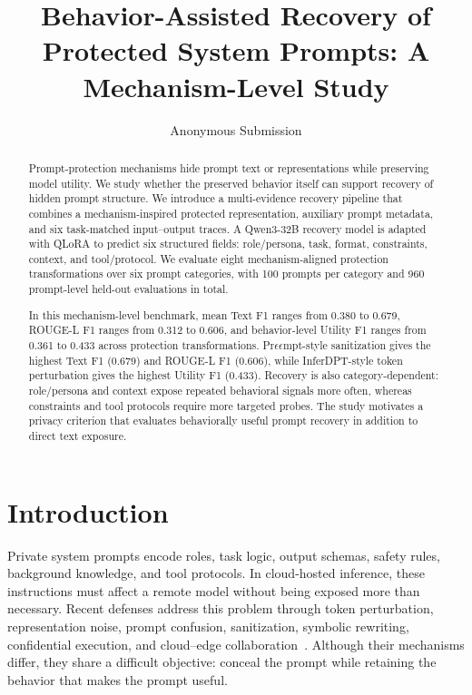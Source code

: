 \documentclass[letterpaper]{article} %
\title{Behavior-Assisted Recovery of Protected System Prompts: A Mechanism-Level Study}
\author{Anonymous Submission}
\begin{document}
\maketitle

\begin{abstract}
Prompt-protection mechanisms hide prompt text or representations while preserving model utility.  We study whether the preserved behavior itself can support recovery of hidden prompt structure.  We introduce a multi-evidence recovery pipeline that combines a mechanism-inspired protected representation, auxiliary prompt metadata, and six task-matched input--output traces.  A Qwen3-32B recovery model is adapted with QLoRA to predict six structured fields: role/persona, task, format, constraints, context, and tool/protocol.  We evaluate eight mechanism-aligned protection transformations over six prompt categories, with 100 prompts per category and 960 prompt-level held-out evaluations in total.

In this mechanism-level benchmark, mean Text F1 ranges from 0.380 to 0.679, ROUGE-L F1 ranges from 0.312 to 0.606, and behavior-level Utility F1 ranges from 0.361 to 0.433 across protection transformations.  Pr$\epsilon\epsilon$mpt-style sanitization gives the highest Text F1 (0.679) and ROUGE-L F1 (0.606), while InferDPT-style token perturbation gives the highest Utility F1 (0.433).  Recovery is also category-dependent: role/persona and context expose repeated behavioral signals more often, whereas constraints and tool protocols require more targeted probes.  The study motivates a privacy criterion that evaluates behaviorally useful prompt recovery in addition to direct text exposure.
\end{abstract}

\section{Introduction}

Private system prompts encode roles, task logic, output schemas, safety rules, background knowledge, and tool protocols.  In cloud-hosted inference, these instructions must affect a remote model without being exposed more than necessary.  Recent defenses address this problem through token perturbation, representation noise, prompt confusion, sanitization, symbolic rewriting, confidential execution, and cloud--edge collaboration~\citep{mai2026confusionprompt,tong2025inferdpt,mai2024split,chowdhury2025preempt,lin2024emojiprompt,lee2024confidential,zhan2026prism}.  Although their mechanisms differ, they share a difficult objective: conceal the prompt while retaining the behavior that makes the prompt useful.
\end{document}
